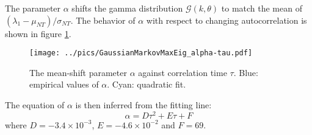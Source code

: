 \documentclass{book}
\begin{document}
The parameter $\alpha$ shifts the gamma distribution $\mathscr{G}(k,
\theta)$ to match the mean of ${(\lambda_1 -
  \mu_{NT})/\sigma_{NT}}$. The behavior of $\alpha$ with respect to
changing autocorrelation is shown in figure
\ref{fig:GaussianMarkovMaxEig_alpha-tau}.
\begin{figure}[htb!]
  \vspace{-15mm}
  \centering
  \texttt{[image: ../pics/GaussianMarkovMaxEig\_alpha-tau.pdf]}
  \caption{\footnotesize The mean-shift parameter $\alpha$ against
    correlation time $\tau$. Blue: empirical values of $\alpha$. Cyan:
    quadratic fit.}
  \label{fig:GaussianMarkovMaxEig_alpha-tau}
\end{figure}
The equation of $\alpha$ is then inferred from the fitting line:
\begin{equation*}
  \alpha = D\tau^2 + E\tau + F
\end{equation*}
where $D = -3.4\times 10^{-3}$, $E = -4.6\times 10^{-2}$ and $F = 69$.
\end{document}

